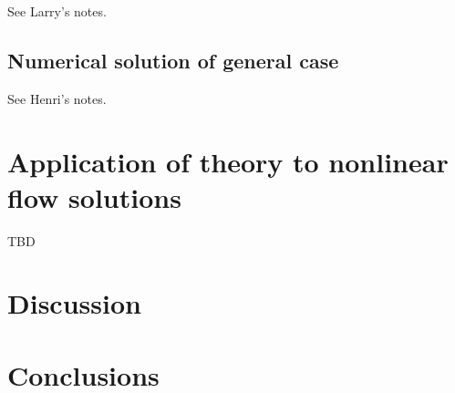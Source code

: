 \documentclass{jfm}
\begin{document}
See Larry's notes.

\subsection{Numerical solution of general case}

See Henri's notes.

\section{Application of theory to nonlinear flow solutions}

TBD

\section{Discussion}

\section{Conclusions}



\end{document}
